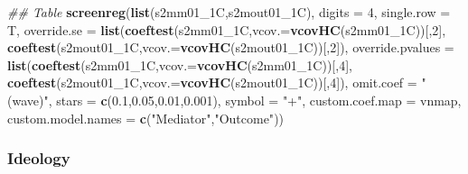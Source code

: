 \documentclass[
]{article}
\newenvironment{Shaded}{\begin{snugshade}}{\end{snugshade}}
\newcommand{\CommentTok}[1]{\textcolor[rgb]{0.56,0.35,0.01}{\textit{#1}}}
\newcommand{\DataTypeTok}[1]{\textcolor[rgb]{0.13,0.29,0.53}{#1}}
\newcommand{\DecValTok}[1]{\textcolor[rgb]{0.00,0.00,0.81}{#1}}
\newcommand{\FloatTok}[1]{\textcolor[rgb]{0.00,0.00,0.81}{#1}}
\newcommand{\KeywordTok}[1]{\textcolor[rgb]{0.13,0.29,0.53}{\textbf{#1}}}
\newcommand{\NormalTok}[1]{#1}
\newcommand{\StringTok}[1]{\textcolor[rgb]{0.31,0.60,0.02}{#1}}
\begin{document}
\begin{Shaded}
\begin{Highlighting}[]
\CommentTok{## Table}
\KeywordTok{screenreg}\NormalTok{(}\KeywordTok{list}\NormalTok{(s2mm01_1C,s2mout01_1C), }\DataTypeTok{digits =} \DecValTok{4}\NormalTok{, }\DataTypeTok{single.row =}\NormalTok{ T,}
          \DataTypeTok{override.se =} \KeywordTok{list}\NormalTok{(}\KeywordTok{coeftest}\NormalTok{(s2mm01_1C,}\DataTypeTok{vcov.=}\KeywordTok{vcovHC}\NormalTok{(s2mm01_1C))[,}\DecValTok{2}\NormalTok{],}
                             \KeywordTok{coeftest}\NormalTok{(s2mout01_1C,}\DataTypeTok{vcov.=}\KeywordTok{vcovHC}\NormalTok{(s2mout01_1C))[,}\DecValTok{2}\NormalTok{]),}
          \DataTypeTok{override.pvalues =} \KeywordTok{list}\NormalTok{(}\KeywordTok{coeftest}\NormalTok{(s2mm01_1C,}\DataTypeTok{vcov.=}\KeywordTok{vcovHC}\NormalTok{(s2mm01_1C))[,}\DecValTok{4}\NormalTok{],}
                                  \KeywordTok{coeftest}\NormalTok{(s2mout01_1C,}\DataTypeTok{vcov.=}\KeywordTok{vcovHC}\NormalTok{(s2mout01_1C))[,}\DecValTok{4}\NormalTok{]),}
          \DataTypeTok{omit.coef =} \StringTok{"(wave)"}\NormalTok{, }\DataTypeTok{stars =} \KeywordTok{c}\NormalTok{(}\FloatTok{0.1}\NormalTok{,}\FloatTok{0.05}\NormalTok{,}\FloatTok{0.01}\NormalTok{,}\FloatTok{0.001}\NormalTok{), }\DataTypeTok{symbol =} \StringTok{"+"}\NormalTok{,}
          \DataTypeTok{custom.coef.map =}\NormalTok{ vnmap, }
          \DataTypeTok{custom.model.names =} \KeywordTok{c}\NormalTok{(}\StringTok{"Mediator"}\NormalTok{,}\StringTok{"Outcome"}\NormalTok{))}
\end{Highlighting}
\end{Shaded}

\hypertarget{ideology}{%
\subsubsection{Ideology}\label{ideology}}
\end{document}

